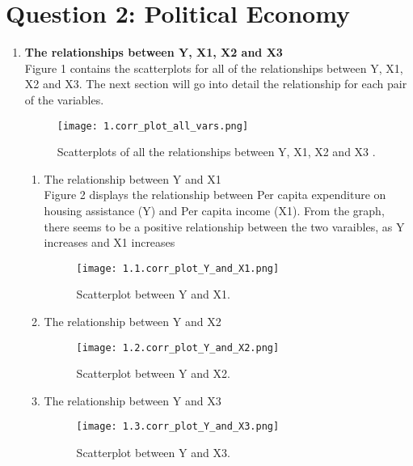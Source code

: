 \documentclass[12pt,letterpaper]{article}
\begin{document}
\section*{Question 2: Political Economy}
\graphicspath{ {C:/Users/Admin/Documents/GitHub/StatsI_Fall2022/problemSets/PS01/Assignment Submission/Graph} }
\begin{enumerate} 
	\item \textbf{The relationships between Y, X1, X2 and X3} \\
	Figure 1 contains the scatterplots for all of the relationships between Y, X1, X2 and X3. The next section will go into detail the relationship for each pair of the variables.\\
		\begin{figure}[h!]\centering
			\caption{\footnotesize Scatterplots of all the relationships between Y, X1, X2 and X3 .}
			\label{fig:plot_1}
			\texttt{[image: 1.corr\_plot\_all\_vars.png]}
		\end{figure}
	
	\begin{enumerate}
		\item The relationship between Y and X1 \\
		Figure 2 displays the relationship between Per capita expenditure on housing assistance (Y) and Per capita income (X1). From the graph, there seems to be a positive relationship between the two varaibles, as Y increases and X1 increases
		\begin{figure}[h!]\centering
			\caption{\footnotesize Scatterplot between Y and X1.}
			\label{fig:plot_1}
			\texttt{[image: 1.1.corr\_plot\_Y\_and\_X1.png]}
		\end{figure}
		
		\item The relationship between Y and X2 \\
		\begin{figure}[h!]\centering
			\caption{\footnotesize Scatterplot between Y and X2.}
			\label{fig:plot_1}
			\texttt{[image: 1.2.corr\_plot\_Y\_and\_X2.png]}
		\end{figure}
	
		\item The relationship between Y and X3 \\
		\begin{figure}[h!]\centering
			\caption{\footnotesize Scatterplot between Y and X3.}
			\label{fig:plot_1}
			\texttt{[image: 1.3.corr\_plot\_Y\_and\_X3.png]}
		\end{figure}
		

\end{enumerate}
\end{enumerate}
\end{document}
